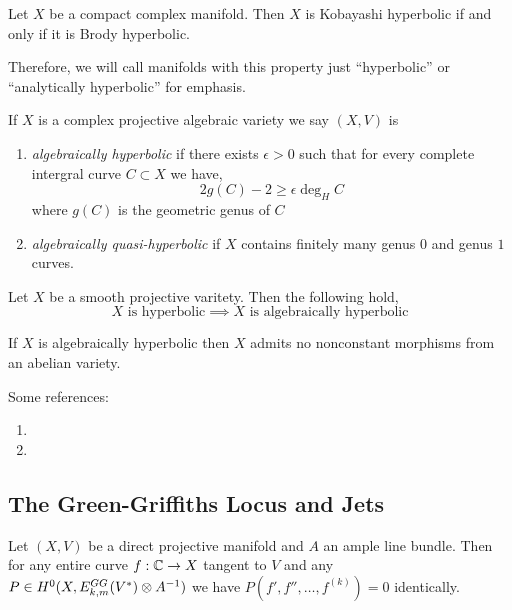 \documentclass[12pt]{article}
\begin{document}
\begin{theorem}[Brody]
Let $X$ be a compact complex manifold. Then $X$ is Kobayashi hyperbolic if and only if it is Brody hyperbolic.
\end{theorem}

\begin{rmk}
Therefore, we will call manifolds with this property just ``hyperbolic'' or ``analytically hyperbolic'' for emphasis. 
\end{rmk}

\begin{defn}
If $X$ is a complex projective algebraic variety we say $(X, V)$ is
\begin{enumerate}
\item \textit{algebraically hyperbolic} if there exists $\epsilon > 0$ such that for every complete intergral curve $C \subset X$ we have,
\[ 2 g(C) - 2 \ge \epsilon \deg_H{C} \]
where $g(C)$ is the geometric genus of $C$
\item \textit{algebraically quasi-hyperbolic} if $X$ contains finitely many genus $0$ and genus $1$ curves.
\end{enumerate}
\end{defn}

\begin{theorem}[Demailly]
Let $X$ be a smooth projective varitety. Then the following hold,
\[ X \text{ is hyperbolic} \implies X \text{ is algebraically hyperbolic} \] 
\end{theorem}

\begin{theorem}
If $X$ is algebraically hyperbolic then $X$ admits no nonconstant morphisms from an abelian variety.
\end{theorem}


Some references:
\begin{enumerate}
\item {}
\item {}
\end{enumerate}

\subsection{The Green-Griffiths Locus and Jets}

\begin{theorem}
Let $(X, V)$ be a direct projective manifold and $A$ an ample line bundle. Then for any entire curve $f : \mathbb{C} \to X$ tangent to $V$ and any $P \in H^0(X, E^{GG}_{k,m}(V^*) \otimes A^{-1})$  we have $P(f', f'', \dots, f^{(k)}) = 0$ identically.
\end{theorem}
\end{document}
